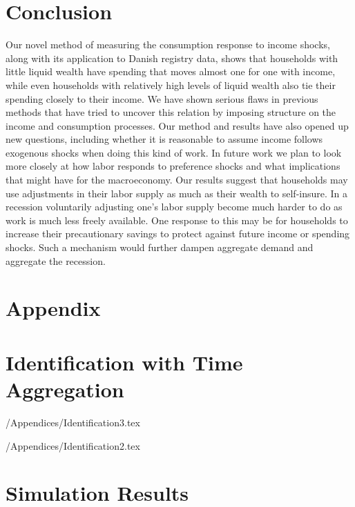 \documentclass[titlepage]{\econtex}\newcommand{\texname}{IncomeUncertainty}
\begin{document}
\section{Conclusion}
Our novel method of measuring the consumption response to income shocks, along with its application to Danish registry data, shows that households with little liquid wealth have spending that moves almost one for one with income, while even households with relatively high levels of liquid wealth also tie their spending closely to their income. We have shown serious flaws in previous methods that have tried to uncover this relation by imposing structure on the income and consumption processes. Our method and results have also opened up new questions, including whether it is reasonable to assume income follows exogenous shocks when doing this kind of work. In future work we plan to look more closely at how labor responds to preference shocks and what implications that might have for the macroeconomy. Our results suggest that households may use adjustments in their labor supply as much as their wealth to self-insure. In a recession voluntarily adjusting one's labor supply become much harder to do as work is much less freely available. One response to this may be for households to increase their precautionary savings to protect against future income or spending shocks. Such a mechanism would further dampen aggregate demand and aggregate the recession.


\processdelayedfloats

\small

\normalsize

\pagebreak
\appendix

\section*{Appendix}

\section{Identification with Time Aggregation}\label{sec:Identification}

\econtexRoot/Appendices/Identification3.tex

\econtexRoot/Appendices/Identification2.tex

\section{Simulation Results}\label{sec:Simulation}
\end{document}
